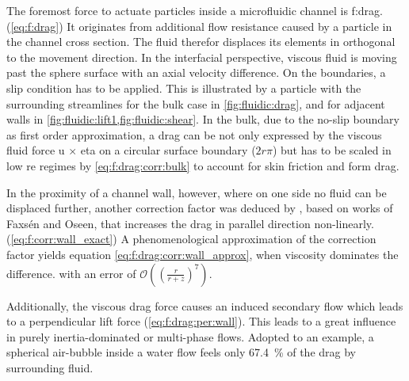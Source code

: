 The foremost force to actuate particles inside a microfluidic channel is \gls{f:drag}.(\cref{eq:f:drag}) It originates from additional flow resistance caused by a particle in the channel cross section. The fluid therefor displaces its elements in orthogonal to the movement direction.\cite{lit:fluidic:motion_sphere_to_plane_surface}  In the interfacial perspective, viscous fluid is moving past the sphere surface with an axial velocity difference. On the boundaries, a slip condition has to be applied. This is illustrated by a particle with the surrounding streamlines for the bulk case in \cref{fig:fluidic:drag}, and for adjacent walls in \cref{fig:fluidic:lift1,fig:fluidic:shear}. In the bulk, due to the no-slip boundary as first order approximation, a drag can be not only expressed by the viscous fluid force \gls{u} $\times$ \gls{eta} on a circular surface boundary ($2r\pi$) but has to be scaled in low \gls{re} regimes by \cref{eq:f:drag:corr:bulk} to account for skin friction and form drag.

In the proximity of a channel wall, however, where on one side no fluid can be displaced further, another correction factor was deduced by \citet{lit:fluid:Hydrodynamics}, based on works of Faxs\'{e}n and Oseen, that increases the drag in parallel direction non-linearly.(\cref{eq:f:corr:wall_exact}) A phenomenological approximation of the correction factor yields equation \cref{eq:f:drag:corr:wall_approx}, when viscosity dominates the difference. with an error of $\mathcal{O}\left((\frac{r}{r+z})^7\right)$.\cite{lit:fluid:velocities, lit:fluidic:motion_sphere_surface_2009} 

Additionally, the viscous drag force causes an induced secondary flow which leads to a perpendicular lift force (\cref{eq:f:drag:per:wall}).\cite{lit:fluid:Hydrodynamics,lit:fluidic:kim} This leads to a great influence in purely inertia-dominated or multi-phase flows.\cite{lit:fluid:deformabilityDiCarlo}  Adopted to an example, a spherical air-bubble inside a water flow feels only \SI{67.4}{\percent} of the drag by surrounding fluid.


